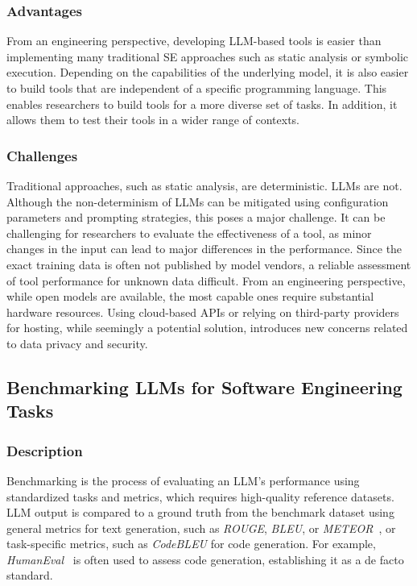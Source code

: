\subsubsection{Advantages}

From an engineering perspective, developing LLM-based tools is easier than implementing many traditional SE approaches such as static analysis or symbolic execution.
Depending on the capabilities of the underlying model, it is also easier to build tools that are independent of a specific programming language.
This enables researchers to build tools for a more diverse set of tasks.
In addition, it allows them to test their tools in a wider range of contexts.

\subsubsection{Challenges}

Traditional approaches, such as static analysis, are deterministic. LLMs are not.
Although the non-determinism of LLMs can be mitigated using configuration parameters and prompting strategies, this poses a major challenge.
It can be challenging for researchers to evaluate the effectiveness of a tool, as minor changes in the input can lead to major differences in the performance.
Since the exact training data is often not published by model vendors, a reliable assessment of tool performance for unknown data difficult.
From an engineering perspective, while open models are available, the most capable ones require substantial hardware resources.
Using cloud-based APIs or relying on third-party providers for hosting, while seemingly a potential solution, introduces new concerns related to data privacy and security.


\subsection{Benchmarking LLMs for Software Engineering Tasks}
\label{sec:benchmarking-llms-for-software-engineering-tasks}

\subsubsection{Description}

Benchmarking is the process of evaluating an LLM's performance using standardized tasks and metrics, which requires high-quality reference datasets.
LLM output is compared to a ground truth from the benchmark dataset using general metrics for text generation, such as \emph{ROUGE}, \emph{BLEU}, or \emph{METEOR}~\cite{10.1145/3695988}, or task-specific metrics, such as \emph{CodeBLEU} for code generation.
For example, \emph{HumanEval}~\cite{DBLP:journals/corr/abs-2107-03374} is often used to assess code generation, establishing it as a de facto standard.

